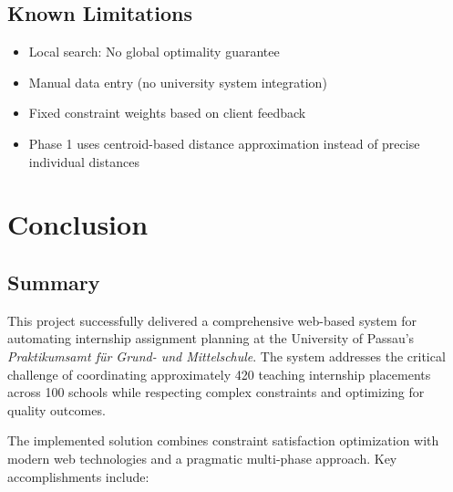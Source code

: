 \documentclass[12pt,a4paper]{report}
\begin{document}
\section{Known Limitations}

\begin{itemize}
    \item Local search: No global optimality guarantee
    \item Manual data entry (no university system integration)
    \item Fixed constraint weights based on client feedback
    \item Phase 1 uses centroid-based distance approximation instead of precise individual distances
\end{itemize}

\chapter{Conclusion}

\section{Summary}

This project successfully delivered a comprehensive web-based system for automating internship assignment planning at the University of Passau's \textit{Praktikumsamt für Grund- und Mittelschule}. The system addresses the critical challenge of coordinating approximately 420 teaching internship placements across 100 schools while respecting complex constraints and optimizing for quality outcomes.

The implemented solution combines constraint satisfaction optimization with modern web technologies and a pragmatic multi-phase approach. Key accomplishments include:
\end{document}
